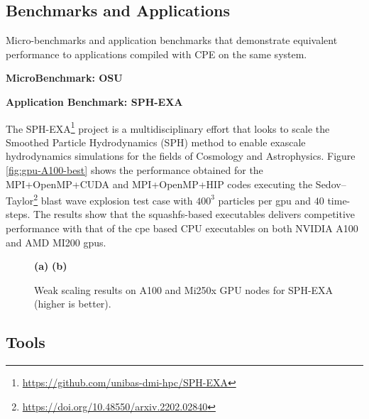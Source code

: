 \subsection{Benchmarks and Applications}


Micro-benchmarks and application benchmarks that demonstrate equivalent performance to applications compiled with CPE on the same system.

\noindent\textbf{MicroBenchmark: OSU}


\noindent\textbf{Application Benchmark: SPH-EXA}

The SPH-EXA\footnote{\url{https://github.com/unibas-dmi-hpc/SPH-EXA}} project is a multidisciplinary effort that looks to scale the Smoothed Particle Hydrodynamics (SPH) method to enable exascale hydrodynamics simulations for the fields of Cosmology and Astrophysics. 
Figure \ref{fig:gpu-A100-best} shows the performance obtained for the MPI+OpenMP+CUDA and MPI+OpenMP+HIP codes executing the Sedov--Taylor\footnote{\url{https://doi.org/10.48550/arxiv.2202.02840}} blast wave explosion test case with $400^3$ particles per gpu and $40$ time-steps.
The results show that the squashfs-based executables delivers competitive performance with that of the cpe based CPU executables on both NVIDIA A100 and AMD MI200 gpus.

\begin{figure*}[htp!]
    \begin{center}
        
        \hfill
        
        \newline
        \textbf{(a)}
        \hspace{7cm}
        \textbf{(b)}
    \end{center}

    \caption{Weak scaling results on A100 and Mi250x GPU nodes for SPH-EXA (higher is better).}
    \label{fig:shp-weak}
\end{figure*}

\subsection{Tools}

